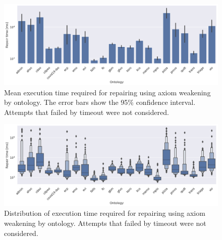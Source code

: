\begin{figure}[ht]
  \begin{widepage}
    \centering
    \includegraphics[width=\textwidth]{resources/time-ontology-bar.png}
  \end{widepage}
  \caption{Mean execution time required for repairing using axiom weakening by ontology. The error bars show the 95\% confidence interval. Attempts that failed by timeout were not considered.}
\end{figure}

\begin{figure}[ht]
  \begin{widepage}
    \centering
    \includegraphics[width=\textwidth]{resources/time-ontology-violin.png}
  \end{widepage}
  \caption{Distribution of execution time required for repairing using axiom weakening by ontology. Attempts that failed by timeout were not considered.}
\end{figure}
